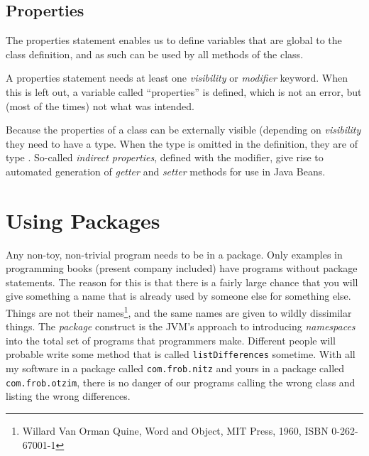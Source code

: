 {\section{Properties}
The properties statement enables us to define variables that are
global to the class definition, and as such can be used by all methods
of the class.
\begin{shaded}\noindent
A properties statement needs at least one \emph{visibility} or
\emph{modifier} keyword. When this is left out, a variable called
``properties'' is defined, which is not an error, but (most of the
times) not what was intended.
\end{shaded}\indent
Because the properties of a class can be externally visible (depending
on \emph{visibility} they need to have a type. When the type is
omitted in the definition, they are of type . So-called
\emph{indirect properties}, defined with the  modifier, give rise to automated generation of
\emph{getter} and \emph{setter} methods for use in Java Beans.
\chapter{Using Packages}
Any non-toy, non-trivial program needs to be in a package. Only
examples in programming books (present company included) have programs
without package statements. The reason
for this is that there is a fairly large chance that you will give
something a name that is already used by someone else for something
else. Things are not their names\footnote{Willard Van Orman Quine, Word
  and Object, MIT Press, 1960, ISBN 0-262-67001-1}, and the same names
are given to wildly dissimilar things. The \emph{package} construct is the JVM's approach to
introducing \emph{namespaces} into the total set of programs that
programmers make. Different people will probable write some method that is
called \texttt{listDifferences} sometime. With all my software in a
package called \texttt{com.frob.nitz} and yours in a package
called \texttt{com.frob.otzim}, there is no danger of our programs
calling the wrong class and listing the wrong differences.

}
